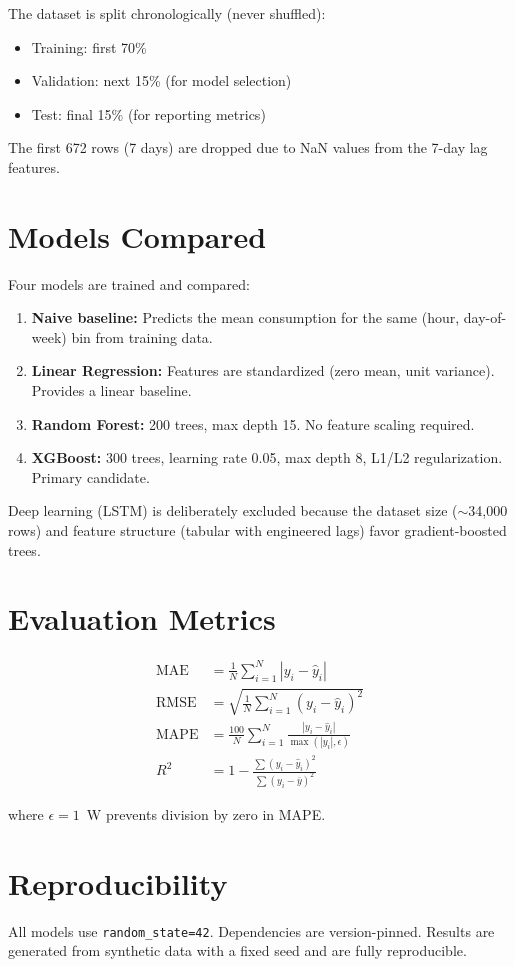 The dataset is split chronologically (never shuffled):
\begin{itemize}[nosep]
    \item Training: first 70\%
    \item Validation: next 15\% (for model selection)
    \item Test: final 15\% (for reporting metrics)
\end{itemize}

The first 672 rows (7 days) are dropped due to NaN values from the 7-day lag features.

\section{Models Compared}

Four models are trained and compared:

\begin{enumerate}
    \item \textbf{Naive baseline:} Predicts the mean consumption for the same (hour, day-of-week) bin from training data.
    \item \textbf{Linear Regression:} Features are standardized (zero mean, unit variance). Provides a linear baseline.
    \item \textbf{Random Forest:} 200 trees, max depth 15. No feature scaling required.
    \item \textbf{XGBoost:} 300 trees, learning rate 0.05, max depth 8, L1/L2 regularization. Primary candidate.
\end{enumerate}

Deep learning (LSTM) is deliberately excluded because the dataset size ($\sim$34,000 rows) and feature structure (tabular with engineered lags) favor gradient-boosted trees.

\section{Evaluation Metrics}

\begin{align}
    \text{MAE} &= \frac{1}{N} \sum_{i=1}^{N} |y_i - \hat{y}_i| \\
    \text{RMSE} &= \sqrt{\frac{1}{N} \sum_{i=1}^{N} (y_i - \hat{y}_i)^2} \\
    \text{MAPE} &= \frac{100}{N} \sum_{i=1}^{N} \frac{|y_i - \hat{y}_i|}{\max(|y_i|, \epsilon)} \\
    R^2 &= 1 - \frac{\sum (y_i - \hat{y}_i)^2}{\sum (y_i - \bar{y})^2}
\end{align}

where $\epsilon = 1$~W prevents division by zero in MAPE.

\section{Reproducibility}

All models use \texttt{random\_state=42}. Dependencies are version-pinned. Results are generated from synthetic data with a fixed seed and are fully reproducible.

